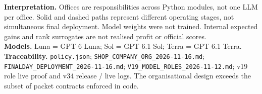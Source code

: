 \documentclass[10pt,a4paper,landscape]{article}
\begin{document}
\begin{center}
\vspace{1mm}
\begin{minipage}{27cm}\fontsize{7.5}{9}\selectfont
\textbf{Interpretation.} Offices are responsibilities across Python modules, not one LLM per office.
Solid and dashed paths represent different operating stages, not simultaneous final deployment.
Model weights were not trained. Internal expected gains and rank surrogates are not realised profit or official scores.\\
\textbf{Models.} Luna = GPT-6 Luna; Sol = GPT-6.1 Sol; Terra = GPT-6.1 Terra. \textbf{Traceability.} \texttt{policy.json}; \texttt{SHOP\_COMPANY\_ORG\_2026-11-16.md};
\texttt{FINALDAY\_DEPLOYMENT\_2026-11-16.md}; \texttt{V19\_MODEL\_ROLES\_2026-11-12.md};
v19 role live proof and v34 release / live logs. The organisational design exceeds the subset of packet contracts enforced in code.
\end{minipage}
\end{center}
\end{document}
